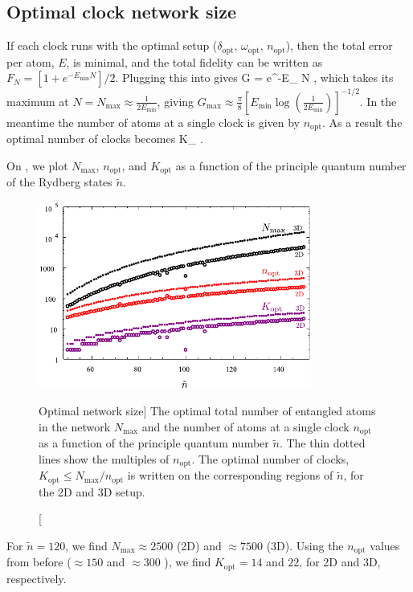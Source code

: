 \subsection{Optimal clock network size}
If each clock runs with the optimal setup ($\delta_\mathrm{opt},\,
\omega_\mathrm{opt},\, n_\mathrm{opt}$), then the total error per atom, $E$, is
minimal, and the total fidelity can be written as $F_N =
\left[1+e^{-E_\mathrm{min}N}\right]/2$. Plugging this into  gives
\bel
	G = e^{-E_ N} ,
\eel 
which takes its maximum at $N = N_\mathrm{max} \approx \frac{1}{2E_\mathrm{min}}$,
giving $G_\mathrm{max} \approx \frac{\pi}{8}
\left[E_\mathrm{min}\log\left(\frac{1}{2E_\mathrm{min}}\right)\right]^{-1/2}$.
In the meantime the number of atoms at a single clock is given by $ n_\mathrm{opt}$.
As a result the optimal number of clocks becomes 
\bel
	K_ \leq {} \approx
	.
\eel

On , we plot $N_{\mathrm{max}}$, $n_\mathrm{opt}$, and
$K_\mathrm{opt}$ as a function of the principle quantum number of the
Rydberg states $\tilde n$.
\begin{figure}[h]
\centering
\includegraphics[width=0.8\textwidth]{./figs_Komar2015/NnK_2d3d.pdf}
\caption
[Optimal network size]
{
\label{fig:K}
The optimal total number of entangled atoms in the network $N_\mathrm{max}$ and
the number of atoms at a single clock $n_\mathrm{opt}$ as a function of the principle quantum
number $\tilde n$. The thin dotted lines show the
multiples of $n_\mathrm{opt}$. The optimal number of clocks,
$K_\mathrm{opt} \leq N_\mathrm{max}/n_\mathrm{opt}$ is written on the corresponding
regions of $\tilde n$, for the 2D and 3D setup.}
\end{figure}
For $\tilde n = 120$, we find $N_\mathrm{max} \approx 2500$ (2D) and $\approx
7500$ (3D). Using the $n_\mathrm{opt}$ values from before ($\approx 150$ and
$\approx 300$ ), we find $K_\mathrm{opt} = 14$ and $22$, for 2D and 3D,
respectively.

